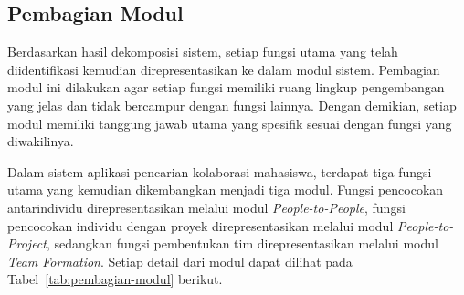 \subsection{Pembagian Modul}

Berdasarkan hasil dekomposisi sistem, setiap fungsi utama yang telah diidentifikasi kemudian direpresentasikan ke dalam modul sistem. Pembagian modul ini dilakukan agar setiap fungsi memiliki ruang lingkup pengembangan yang jelas dan tidak bercampur dengan fungsi lainnya. Dengan demikian, setiap modul memiliki tanggung jawab utama yang spesifik sesuai dengan fungsi yang diwakilinya.

Dalam sistem aplikasi pencarian kolaborasi mahasiswa, terdapat tiga fungsi utama yang kemudian dikembangkan menjadi tiga modul. Fungsi pencocokan antarindividu direpresentasikan melalui modul \emph{People-to-People}, fungsi pencocokan individu dengan proyek direpresentasikan melalui modul \emph{People-to-Project}, sedangkan fungsi pembentukan tim direpresentasikan melalui modul \emph{Team Formation}. Setiap detail dari modul dapat dilihat pada Tabel~\ref{tab:pembagian-modul} berikut.

